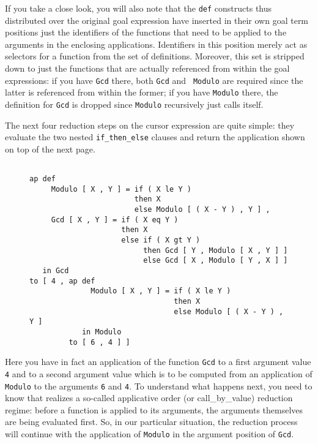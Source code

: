 If you take a close look, you will also note that
the {\tt def} constructs thus distributed over the original 
goal expression have inserted in their own goal term positions
just the identifiers of the functions that need to
be applied to the arguments in the enclosing applications. 
Identifiers in this position merely act as selectors for a
function from the set of definitions. Moreover, this set 
is stripped down to
 just the functions that are actually referenced from within
the goal expressions: if you have {\tt Gcd} there, both {\tt Gcd} and {\tt
Modulo} are required since the latter is referenced from within the former;
if you have {\tt Modulo} there, the definition for {\tt Gcd} is dropped
since {\tt Modulo} recursively just calls itself. 

The next  four reduction steps on the cursor expression are quite simple: they
evaluate the two nested {\tt if\_then\_else} clauses and return the application shown on top of the next page.
\begin{figure}
\begin{verbatim}

ap def 
     Modulo [ X , Y ] = if ( X le Y )
                        then X
                        else Modulo [ ( X - Y ) , Y ] ,
     Gcd [ X , Y ] = if ( X eq Y )
                     then X
                     else if ( X gt Y )
                          then Gcd [ Y , Modulo [ X , Y ] ]
                          else Gcd [ X , Modulo [ Y , X ] ]
   in Gcd
to [ 4 , ap def 
              Modulo [ X , Y ] = if ( X le Y )
                                 then X
                                 else Modulo [ ( X - Y ) , Y ]
            in Modulo
         to [ 6 , 4 ] ]

\end{verbatim}
\end{figure}
Here you have in fact an application of the function {\tt Gcd} to a first
argument value {\tt 4} and to a second argument value which is to be computed
from an application of {\tt Modulo} to the arguments {\tt 6} and {\tt 4}.
To understand what happens next, you need to know that \pired realizes
a so-called {\mys applicative order} (or {\mys call\_by\_value})
reduction regime: before a function is applied to its arguments, the
arguments themselves are being evaluated first. So, in our particular
situation, the reduction process will continue with the application of
{\tt Modulo} in the argument position of {\tt Gcd}.

